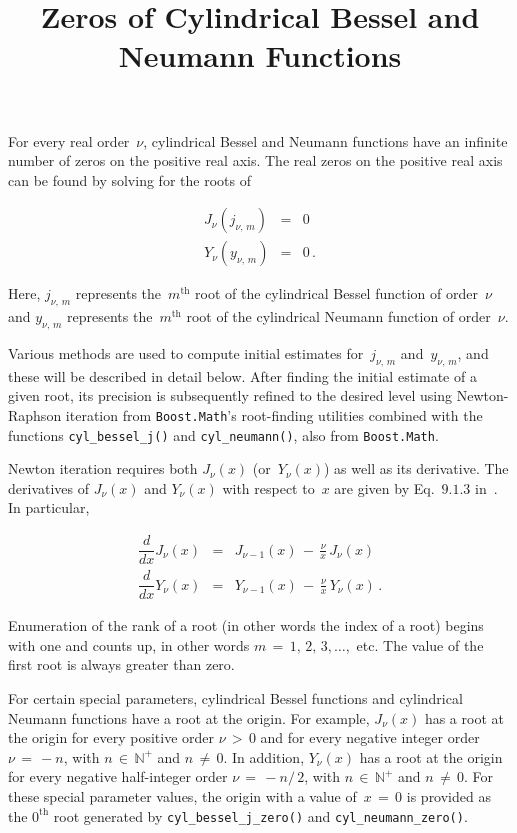\documentclass{article}[10pt]
\begin{document}
\title{Zeros of Cylindrical Bessel and Neumann Functions}
\maketitle

\noindent
For every real order~$\nu$, cylindrical Bessel and Neumann
functions have an infinite number of zeros on the positive
real axis. The real zeros on the positive real axis
can be found by solving for the roots of

\begin{eqnarray}
J_{\nu}
\left(j_{\nu,\,m}\right)
&=&
0
\nonumber \\
Y_{\nu}
\left(y_{\nu,\,m}\right)
&=&
0
\,{\text{.}}
\end{eqnarray}

\noindent
Here, $j_{\nu,\,m}$ represents the~$m^{\text{th}}$
root of the cylindrical Bessel function of order~$\nu$
and $y_{\nu,\,m}$ represents the~$m^{\text{th}}$
root of the cylindrical Neumann function of order~$\nu$.

Various methods are used to compute initial estimates
for~$j_{\nu,\,m}$ and~$y_{\nu,\,m}$, and these will be described
in detail below. After finding the initial estimate of a given root,
its precision is subsequently refined to the desired level
using Newton-Raphson iteration from \lstinline|Boost.Math|'s
root-finding utilities combined with the functions
\lstinline|cyl_bessel_j()| and \lstinline|cyl_neumann()|,
also from \lstinline|Boost.Math|.

Newton iteration requires both $J_{\nu}(x)$ (or~$Y_{\nu}(x)$)
as well as its derivative. The derivatives of $J_{\nu}(x)$ and $Y_{\nu}(x)$
with respect to~$x$ are given by
Eq.~$9$.$1$.$3$ in~\cite{bibitem:abramowitz}.
In particular,

\begin{eqnarray}
\dfrac{d}{dx}J_{\nu}(x)
&=&
J_{\nu - 1}(x)
\,-\,
\frac{\nu}{x}\,J_{\nu}(x)
\nonumber \\
\dfrac{d}{dx}Y_{\nu}(x)
&=&
Y_{\nu - 1}(x)
\,-\,
\frac{\nu}{x}\,Y_{\nu}(x)
\,{\text{.}}
\end{eqnarray}

Enumeration of the rank of a root
(in other words the index of a root)
begins with one and counts up, in other words
$m\,=\,1,\,2,\,3,\ldots$,~etc. The value of the
first root is always greater than zero.

For certain special parameters, cylindrical Bessel functions
and cylindrical Neumann functions have
a root at the origin. For example,
$J_{\nu }(x)$ has a root at the origin for every positive order
$\nu\,>\,0$ and for every negative integer order
$\nu\,=\,-n$, with $n\,\in\,\mathbb{N}^{+}$
and $n\,\ne\,0$.
In addition, $Y_{\nu }(x)$ has a root at the origin
for every negative half-integer order
$\nu\,=\,-n/\,2$, with $n\,\in\,\mathbb{N}^{+}$
and $n\,\ne\,0$.
For these special parameter values, the origin with
a value of~$x\,=\,0$ is provided as the $0^{\text{th}}$
root generated by {\lstinline|cyl_bessel_j_zero()|}
and {\lstinline|cyl_neumann_zero()|}.
\end{document}
